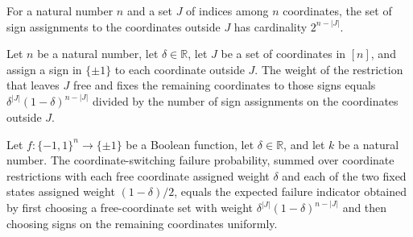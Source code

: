 \begin{theorem}
\label{FABL.card_fixedSignCube}
\leanok
{}
For a natural number $n$ and a set $J$ of indices among $n$ coordinates, the set of sign
assignments to the coordinates outside $J$ has cardinality $2^{n-|J|}$.
\end{theorem}

\begin{theorem}
\label{FABL.restrictionAssignmentWeightAt_coordRestrictionOf_eq_div}
\leanok
{}
Let $n$ be a natural number, let $\delta\in\mathbb R$, let $J$ be a set of coordinates
in $[n]$, and assign a sign in $\{\pm1\}$ to each coordinate outside $J$. The weight of
the restriction that leaves $J$ free and fixes the remaining coordinates to those signs
equals $\delta^{|J|}(1-\delta)^{n-|J|}$ divided by the number of sign assignments on the
coordinates outside $J$.
\end{theorem}

\begin{theorem}
\label{FABL.coordSwitchingFailureProbability_eq}
\leanok
{}
Let $f:\{-1,1\}^n\to\{\pm1\}$ be a Boolean function, let $\delta\in\mathbb R$,
and let $k$ be a natural number. The coordinate-switching failure probability, summed
over coordinate restrictions with each free coordinate assigned weight $\delta$ and
each of the two fixed states assigned weight $(1-\delta)/2$, equals the expected
failure indicator obtained by first choosing a free-coordinate set with weight
$\delta^{|J|}(1-\delta)^{n-|J|}$ and then choosing signs on the remaining coordinates
uniformly.
\end{theorem}

